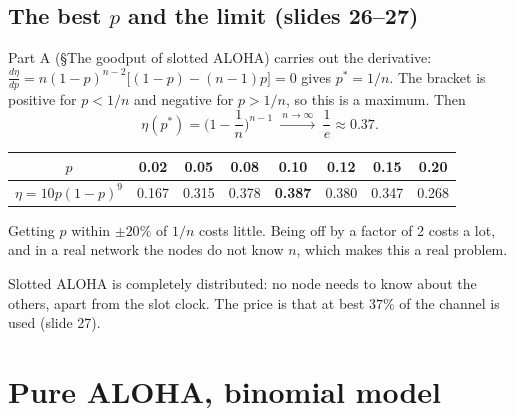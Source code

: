 \subsection{The best $p$ and the limit (slides 26--27)}

Part A (\S The goodput of slotted ALOHA) carries out the derivative: $\frac{d\eta}{dp} = n(1-p)^{n-2}\big[(1-p)-(n-1)p\big] = 0$ gives $p^* = 1/n$.
The bracket is positive for $p<1/n$ and negative for $p>1/n$, so this is a maximum. Then
\[ \eta(p^*) = \Big(1-\frac1n\Big)^{n-1}\ \xrightarrow{\ n\to\infty\ }\ \frac1e\approx0.37. \]

\begin{example}[How sharp is the peak? $n=10$]
\begin{center}
\renewcommand{\arraystretch}{1.2}
\begin{tabular}{c|ccccccc}
$p$ & 0.02 & 0.05 & 0.08 & \textbf{0.10} & 0.12 & 0.15 & 0.20\\\hline
$\eta = 10p(1-p)^9$ & 0.167 & 0.315 & 0.378 & \textbf{0.387} & 0.380 & 0.347 & 0.268\\
\end{tabular}
\end{center}
Getting $p$ within $\pm20\%$ of $1/n$ costs little. Being off by a factor of 2 costs a lot, and in a real network the nodes do not know $n$, which makes this a real problem.
\end{example}

\begin{intuition}
Slotted ALOHA is completely distributed: no node needs to know about the others, apart from the slot clock. The price is that at best $37\%$ of the channel is used (slide 27).
\end{intuition}

\section{Pure ALOHA, binomial model}

\begin{center}
\end{center}

